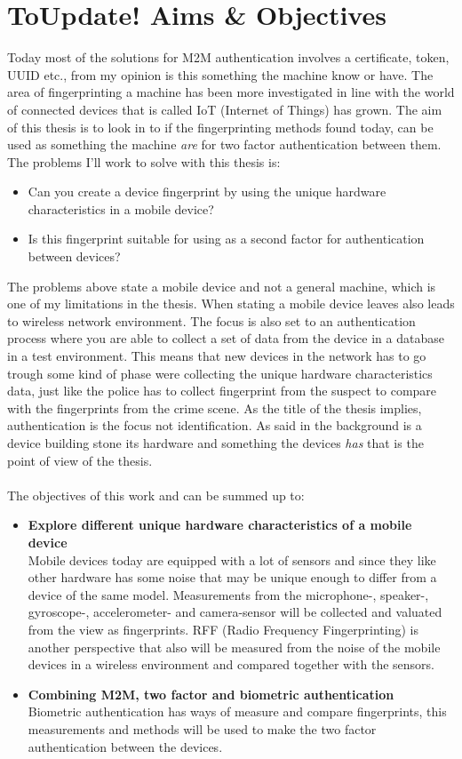 \section{\textbf{ToUpdate! }Aims \& Objectives}\label{sec:aim}
Today most of the solutions for M2M authentication involves a certificate, token, UUID etc., from my opinion is this something the machine know or have. The area of fingerprinting a machine has been more investigated in line with the world of connected devices that is called IoT (Internet of Things) has grown. The aim of this thesis is to look in to if the fingerprinting methods found today, can be used as something the machine \textit{are} for two factor authentication between them. The problems I'll work to solve with this thesis is:
\begin{itemize}
	\item[] Can you create a device fingerprint by using the unique hardware characteristics in a mobile device?
	\item[] Is this fingerprint suitable for using as a second factor for authentication between devices?
\end{itemize}
The problems above state a mobile device and not a general machine, which is one of my limitations in the thesis. When stating a mobile device leaves also leads to wireless network environment. The focus is also set to an authentication process where you are able to collect a set of data from the device in a database in a test environment. This means that new devices in the network has to go trough some kind of phase were collecting the unique hardware characteristics data, just like the police has to collect fingerprint from the suspect to compare with the fingerprints from the crime scene. As the title of the thesis implies, authentication is the focus not identification. As said in the background is a device building stone its hardware and something the devices \textit{has} that is the point of view of the thesis. \\
\\
The objectives of this work and can be summed up to:
\begin{itemize}
	\item[] \textbf{Explore different unique hardware characteristics of a mobile device} \\
	Mobile devices today are equipped with a lot of sensors and since they like other hardware has some noise that may be unique enough to differ from a device of the same model. Measurements from the microphone-, speaker-, gyroscope-, accelerometer- and camera-sensor will be collected and valuated from the view as fingerprints. RFF (Radio Frequency Fingerprinting) is another perspective that also will be measured from the noise of the mobile devices in a wireless environment and compared together with the sensors.
	\item[] \textbf{Combining M2M, two factor and biometric authentication} \\
	Biometric authentication has ways of measure and compare fingerprints, this measurements and methods will be used to make the two factor authentication between the devices.
\end{itemize}

